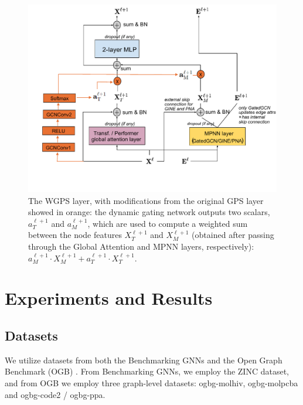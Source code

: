 \documentclass{acmart}
\begin{document}
\begin{figure}[ht]
  \centering
  \includegraphics[width=1\textwidth]{WGPS-layer}
  \caption{The WGPS layer, with modifications from the original GPS layer showed in orange: the dynamic gating network outputs two scalars, $a_T^{{\ell}+1}$ and $a_M^{{\ell}+1}$, which are used to compute a weighted sum between the node features $X_T^{{\ell}+1}$ and $X_M^{{\ell}+1}$ (obtained after passing through the Global Attention and MPNN layers, respectively): $a_M^{{\ell}+1} \cdot X_M^{{\ell}+1} + a_T^{{\ell}+1} \cdot X_T^{{\ell}+1}$.
}
  \label{fig:wgps_layer}
\end{figure}

\section{Experiments and Results}


\subsection{Datasets}
We utilize datasets from both the Benchmarking GNNs \cite{dwivedi2022benchmarkinggraphneuralnetworks} and the Open Graph Benchmark (OGB) \cite{hu2021opengraphbenchmarkdatasets}. From Benchmarking GNNs, we employ the ZINC dataset, and from OGB we employ three graph-level datasets: ogbg-molhiv, ogbg-molpcba and ogbg-code2 / ogbg-ppa.
\end{document}
